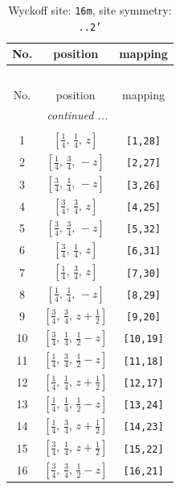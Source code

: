 \documentclass[fleqn,8pt]{jsarticle}
\begin{document}
\begin{longtable}{ccc}
\caption{Wyckoff site: {\tt 16m}, site symmetry: {\tt ..2'}}
 \\
 \hline \hline
No. & position & mapping \\ \hline \endfirsthead

\multicolumn{2}{l}{\tablename\ \thetable{}} \\
 \hline \hline
No. & position & mapping \\ \hline \endhead

 \hline \hline
\multicolumn{2}{r}{\footnotesize\it continued ...} \\ \endfoot

 \hline \hline
\multicolumn{2}{r}{} \\ \endlastfoot

1 & $\left[ \frac{1}{4},\, \frac{1}{4},\, z \right]$ & {\tt [1,28]} \\ \hline
2 & $\left[ \frac{1}{4},\, \frac{3}{4},\, - z \right]$ & {\tt [2,27]} \\ \hline
3 & $\left[ \frac{3}{4},\, \frac{1}{4},\, - z \right]$ & {\tt [3,26]} \\ \hline
4 & $\left[ \frac{3}{4},\, \frac{3}{4},\, z \right]$ & {\tt [4,25]} \\ \hline
5 & $\left[ \frac{3}{4},\, \frac{3}{4},\, - z \right]$ & {\tt [5,32]} \\ \hline
6 & $\left[ \frac{3}{4},\, \frac{1}{4},\, z \right]$ & {\tt [6,31]} \\ \hline
7 & $\left[ \frac{1}{4},\, \frac{3}{4},\, z \right]$ & {\tt [7,30]} \\ \hline
8 & $\left[ \frac{1}{4},\, \frac{1}{4},\, - z \right]$ & {\tt [8,29]} \\ \hline
9 & $\left[ \frac{3}{4},\, \frac{3}{4},\, z + \frac{1}{2} \right]$ & {\tt [9,20]} \\ \hline
10 & $\left[ \frac{3}{4},\, \frac{1}{4},\, \frac{1}{2} - z \right]$ & {\tt [10,19]} \\ \hline
11 & $\left[ \frac{1}{4},\, \frac{3}{4},\, \frac{1}{2} - z \right]$ & {\tt [11,18]} \\ \hline
12 & $\left[ \frac{1}{4},\, \frac{1}{4},\, z + \frac{1}{2} \right]$ & {\tt [12,17]} \\ \hline
13 & $\left[ \frac{1}{4},\, \frac{1}{4},\, \frac{1}{2} - z \right]$ & {\tt [13,24]} \\ \hline
14 & $\left[ \frac{1}{4},\, \frac{3}{4},\, z + \frac{1}{2} \right]$ & {\tt [14,23]} \\ \hline
15 & $\left[ \frac{3}{4},\, \frac{1}{4},\, z + \frac{1}{2} \right]$ & {\tt [15,22]} \\ \hline
16 & $\left[ \frac{3}{4},\, \frac{3}{4},\, \frac{1}{2} - z \right]$ & {\tt [16,21]} \\
\end{longtable}
\end{document}
